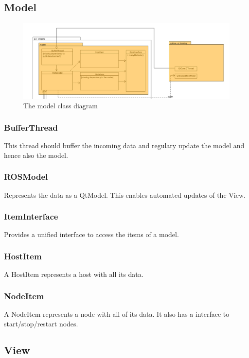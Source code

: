 \mbox{}

\subsection{Model}

\begin{figure}[!ht]
\begin{center}
\includegraphics[width=1.0\linewidth]{./bilder/model.png}
\caption{The model class diagram}
\end{center}
\end{figure}

\subsubsection{BufferThread}
This thread should buffer the incoming data and regulary update the model and
hence also the model.
\subsubsection{ROSModel}
Represents the data as a QtModel. This enables automated updates of the View.
\subsubsection{ItemInterface}
Provides a unified interface to access the items of a model.
\subsubsection{HostItem}
A HostItem represents a host with all its data.
\subsubsection{NodeItem}
 A NodeItem represents a node with all of its data. It also has a interface to start/stop/restart nodes.

\subsection{View}

